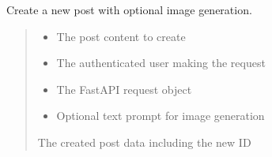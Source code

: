 \documentclass[letterpaper,10pt,openany,oneside,english]{sphinxmanual}
\begin{document}

\begin{savenotes}\begin{fulllineitems}
\label{\detokenize{modules/routers:storeapi.routers.post.create_post}}
\pysigstartsignatures
{}
\pysigstopsignatures
\sphinxAtStartPar
Create a new post with optional image generation.
\begin{quote}\begin{description}
\begin{itemize}
\item {} 
\sphinxAtStartPar
{} \textendash{} The post content to create

\item {} 
\sphinxAtStartPar
{} \textendash{} The authenticated user making the request

\item {} 
\sphinxAtStartPar
{} \textendash{} The FastAPI request object

\item {} 
\sphinxAtStartPar
{} \textendash{} Optional text prompt for image generation

\end{itemize}

\sphinxAtStartPar
The created post data including the new ID

\end{description}\end{quote}

\end{fulllineitems}\end{savenotes}
\end{document}
